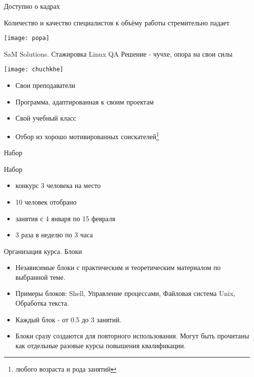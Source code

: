 \begin{frame}[fragile]{Доступно о кадрах}
 
  \begin{center}
    \Large Количество и качество \newline специалистов к объёму работы \newline стремительно падает 

    \texttt{[image: popa]}
  \end{center}

\end{frame}

\begin{frame}{SaM Solutions. Стажировка Linux QA}
  \center\alert{Решение - чучхе, опора на свои силы}
  
  \center\texttt{[image: chuchkhe]}

  \begin{itemize}
    \item Свои преподаватели
    \item Программа, адаптированная к своим проектам
    \item Свой учебный класс
    \item Отбор из хорошо мотивированных соискателей\footnote{любого возраста и рода занятий}
  \end{itemize} 


\end{frame}

\begin{frame}{Набор}


  \alert{Набор}
  \begin{itemize}
    \item конкурс 3 человека на место
    \item 10 человек отобрано
    \item занятия с 4 января по 15 февраля
    \item 3 раза в неделю по 3 часа
  \end{itemize}

\end{frame}

\begin{frame}{Организация курса. Блоки}
  
  \begin{itemize}
    \item Независимые блоки с практическим и теоретическим материалом по выбранной теме.
    \item Примеры блоков: Shell, Управление процессами, Файловая система Unix, Обработка текста.
    \item Каждый блок - от 0.5 до 3 занятий.
    \item Блоки сразу создаются для повторного использования.  \newline
      Могут быть прочитаны как отдельные разовые курсы повышения квалификации.
  \end{itemize}

\end{frame}


